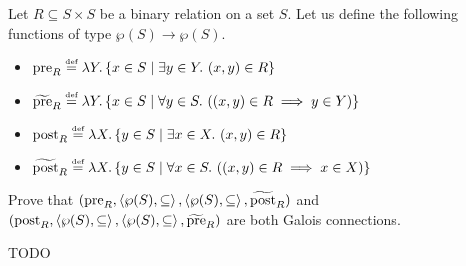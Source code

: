 \begin{exercise}{
    Let $R \subseteq S \times S$ be a binary relation on a set $S$. Let us define the following functions of type $\wp(S) \to \wp(S)$.
    \begin{itemize}
        \item $\operatorname{pre}_R \overset{\text{\tiny def}}{=} \lambda Y. \left\{ x \in S \mid \exists y \in Y.\ (x, y) \in R \right\}$
        \item $\widetilde{\operatorname{pre}}_R \overset{\text{\tiny def}}{=} \lambda Y. \left\{ x \in S \mid \forall y \in S.\ ((x, y) \in R \implies y \in Y)\right\}$
        \item $\operatorname{post}_R \overset{\text{\tiny def}}{=} \lambda X. \left\{ y \in S \mid \exists x \in X.\ (x, y) \in R \right\}$
        \item $\widetilde{\operatorname{post}}_R \overset{\text{\tiny def}}{=} \lambda X. \left\{ y \in S \mid \forall x \in S.\ ((x, y) \in R \implies x \in X)\right\}$
    \end{itemize}
    Prove that $(\operatorname{pre}_R, \left<\wp(S), \subseteq\right>, \left<\wp(S), \subseteq\right>, \widetilde{\operatorname{post}}_R)$ and $(\operatorname{post}_R, \left<\wp(S), \subseteq\right>, \left<\wp(S), \subseteq\right>, \widetilde{\operatorname{pre}}_R)$ are both Galois connections.
}
    TODO
\end{exercise}
